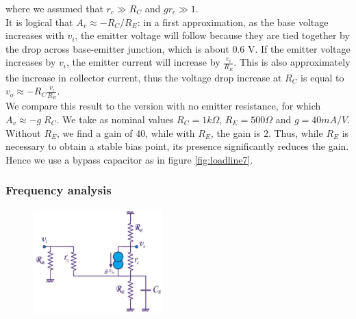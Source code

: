 where we assumed that $r_c \gg R_C$ and $g r_c \gg 1$.\\
It is logical that $A_v \approx -R_C/R_E$: in a first approximation, as the base voltage increases with $v_i$, the emitter voltage will follow because they are tied together by the drop across base-emitter junction, which is about $0.6$ V. If the emitter voltage increases by $v_i$, the emitter current will increase by $\frac{v_i}{R_E}$. This is also approximately the increase in collector current, thus the voltage drop increase at $R_C$ is equal to $v_o \approx -R_C \frac{v_i}{R_E}$.\\
We compare this result to the version with no emitter resistance, for which $A_v \approx -g\;R_C$. We take as nominal values $R_C = 1 k\Omega$, $R_E = 500 \Omega$ and $g = 40 mA/V$. Without $R_E$, we find a gain of $40$, while with $R_E$, the gain is $2$. Thus, while $R_E$ is necessary to obtain a stable bias point, its presence significantly reduces the gain. Hence we use a bypass capacitor as in figure \ref{fig:loadline7}.
\subsubsection{Frequency analysis}
\begin{figure}
	\centering
	\includegraphics[width=5cm]{figures/ch02/amplifier5.jpg}
	\caption{}%
	\label{fig:amplifier5}
\end{figure}


